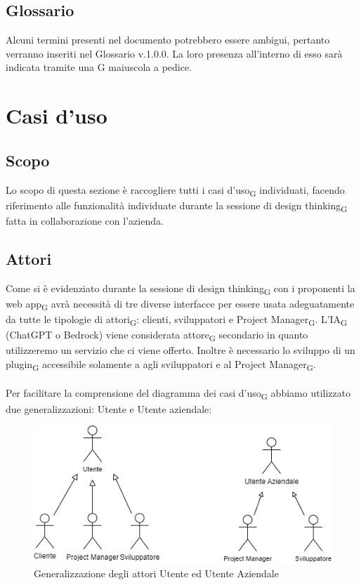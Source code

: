 \documentclass{article}
\begin{document}
\subsection*{Glossario}
Alcuni termini presenti nel documento potrebbero essere ambigui, pertanto verranno inseriti nel Glossario v.1.0.0. La loro presenza all'interno di esso sarà indicata tramite una G maiuscola a pedice.

\section*{Casi d'uso}
\subsection*{Scopo}
Lo scopo di questa sezione è raccogliere tutti i casi d'uso\textsubscript{G} individuati, facendo riferimento alle funzionalità individuate durante la sessione di design thinking\textsubscript{G} fatta in collaborazione con l'azienda.

\subsection*{Attori}
Come si è evidenziato durante la sessione di design thinking\textsubscript{G} con i proponenti la web app\textsubscript{G} avrà necessità di tre diverse interfacce per essere usata adeguatamente da tutte le tipologie di attori\textsubscript{G}: clienti, sviluppatori e Project Manager\textsubscript{G}. L'IA\textsubscript{G}  (ChatGPT o Bedrock) viene considerata attore\textsubscript{G} secondario in quanto utilizzeremo un servizio che ci viene offerto. Inoltre è necessario lo sviluppo di un plugin\textsubscript{G} accessibile solamente a agli sviluppatori e al Project Manager\textsubscript{G}.\\\\

Per facilitare la comprensione del diagramma dei casi d'uso\textsubscript{G}  abbiamo utilizzato due generalizzazioni: Utente e Utente aziendale: 

\begin{figure}[h]
    \centering
    \includegraphics{./imgUML/Attori.png}
    \caption{Generalizzazione degli attori Utente ed Utente Aziendale}
    \label{fig:attori}
\end{figure}
\end{document}
